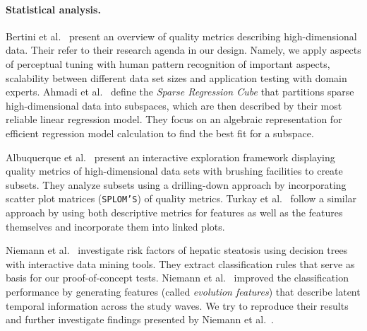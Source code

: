 \documentclass[journal]{style/vgtc} 			          %
\begin{document}
\paragraph{Statistical analysis.}
Bertini et al.~\cite{Bertini} present an overview of quality metrics describing high-dimensional data.
Their refer to their research agenda in our design.
Namely, we apply aspects of perceptual tuning with human pattern recognition of important aspects, scalability between different data set sizes and application testing with domain experts.
Ahmadi et al.~\cite{Ahmadi} define the \emph{Sparse Regression Cube} that partitions sparse high-dimensional data into subspaces, which are then described by their most reliable linear regression model.
They focus on an algebraic representation for efficient regression model calculation to find the best fit for a subspace.

Albuquerque et al.~\cite{Albuquerque} present an interactive exploration framework displaying quality metrics of high-dimensional data sets with brushing facilities to create subsets.
They analyze subsets using a drilling-down approach by incorporating scatter plot matrices (\texttt{SPLOM'S}) of quality metrics. %
Turkay et al.~\cite{Turkay} follow a similar approach by using both descriptive metrics for features as well as the features themselves and incorporate them into linked plots.

Niemann et al.~\cite{Niemann2014} investigate risk factors of hepatic steatosis using decision trees with interactive data mining tools.
They extract classification rules that serve as basis for our proof-of-concept tests.
Niemann et al.~\cite{Niemann2015} improved the classification performance by generating features (called \emph{evolution features}) that describe latent temporal information across the study waves.
We try to reproduce their results and further investigate findings presented by Niemann et al.~\cite{Niemann2014}.
\end{document}
